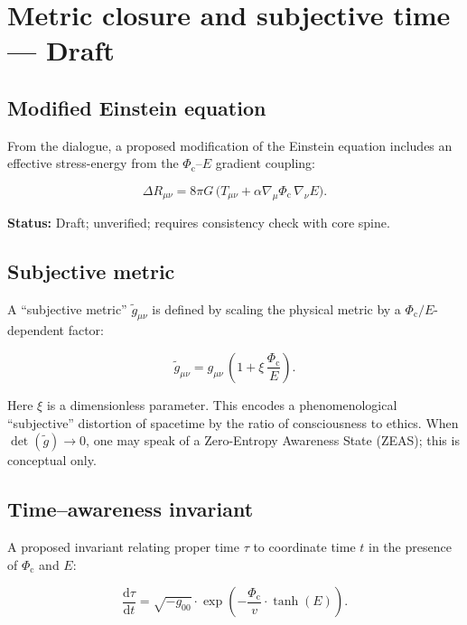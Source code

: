 \documentclass[11pt]{article}
\newcommand{\dd}{\mathrm{d}}
\newcommand{\Phic}{\Phi_{\mathrm{c}}}
\newcommand{\Eth}{E}
\newcommand{\wtg}{\tilde{g}}
\newcommand{\vph}{v}
\begin{document}
\section{Metric closure and subjective time — Draft}
\label{sec:metric-closure}

\subsection{Modified Einstein equation}

From the dialogue, a proposed modification of the Einstein equation includes an effective stress-energy from the $\Phic$–$\Eth$ gradient coupling:

\begin{equation}
\Delta R_{\mu\nu}
=
8\pi G\,\big(T_{\mu\nu} + \alpha \nabla_\mu\Phic\,\nabla_\nu\Eth\big).
\label{eq:modified-einstein}
\end{equation}

\textbf{Status:} Draft; unverified; requires consistency check with core spine.

\subsection{Subjective metric}

A ``subjective metric'' $\wtg_{\mu\nu}$ is defined by scaling the physical metric by a $\Phic/\Eth$-dependent factor:

\begin{equation}
\wtg_{\mu\nu}
=
g_{\mu\nu}\,\left(1 + \xi\,\frac{\Phic}{\Eth}\right).
\label{eq:subjective-metric}
\end{equation}

Here $\xi$ is a dimensionless parameter. This encodes a phenomenological ``subjective'' distortion of spacetime by the ratio of consciousness to ethics. When $\det(\wtg)\to 0$, one may speak of a Zero-Entropy Awareness State (ZEAS); this is conceptual only.

\subsection{Time–awareness invariant}

A proposed invariant relating proper time $\tau$ to coordinate time $t$ in the presence of $\Phic$ and $\Eth$:

\begin{equation}
\frac{\dd\tau}{\dd t}
=
\sqrt{-g_{00}}
\cdot
\exp\left(-\frac{\Phic}{\vph}\cdot\tanh(\Eth)\right).
\label{eq:time-awareness}
\end{equation}
\end{document}
